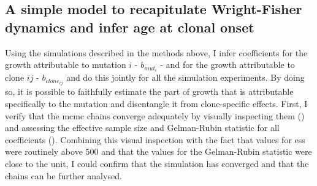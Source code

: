 \begin{figure}[!h]
	\label{fig:replicate-data}
\end{figure}

\begin{figure}
	\label{fig:overdispersion-chains}
\end{figure}

\begin{figure}
	\label{fig:overdispersion-longitudinal}
\end{figure}

\FloatBarrier

\subsection{A simple model to recapitulate Wright-Fisher dynamics and infer age at clonal onset}

Using the simulations described in the methods above, I infer coefficients for the growth attributable to mutation $i$ - $b_{mut_i}$ - and for the growth attributable to clone $ij$ - $b_{clone_{ij}}$ and do this jointly for all the simulation experiments. By doing so, it is possible to faithfully estimate the part of growth that is attributable specifically to the mutation and disentangle it from clone-specific effects. First, I verify that the \ac{mcmc} chains converge adequately by visually inspecting them () and assessing the effective sample size and Gelman-Rubin statistic for all coefficients (). Combining this visual inspection with the fact that values for \ac{ess} were routinely above 500 and that the values for the Gelman-Rubin statistic were close to the unit, I could confirm that the simulation has converged and that the chains can be further analysed. 

